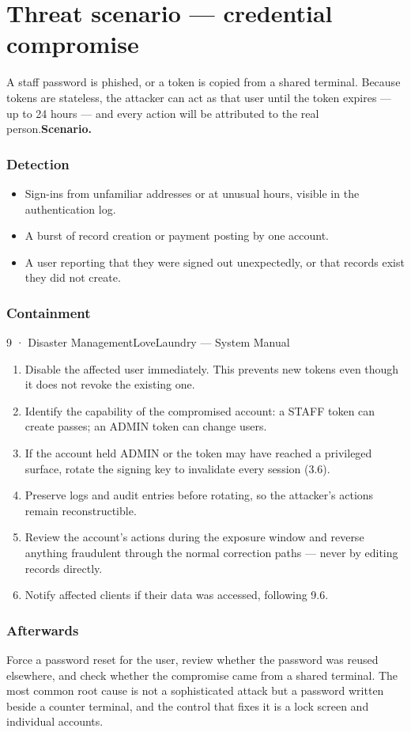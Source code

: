 \documentclass[11pt,a4paper,oneside]{book}
\begin{document}
\section*{Threat scenario — credential compromise}
A staff password is phished, or a token is copied from a shared terminal. Because tokens are stateless, the attacker can act as that user until the token expires — up to 24 hours — and every action will be attributed to the real person.\textbf{Scenario.}

\subsubsection*{Detection}
\begin{itemize}
\item Sign-ins from unfamiliar addresses or at unusual hours, visible in the authentication log.
\item A burst of record creation or payment posting by one account.
\item A user reporting that they were signed out unexpectedly, or that records exist they did not create.
\end{itemize}
\subsubsection*{Containment}
9 · Disaster ManagementLoveLaundry — System Manual

\begin{enumerate}
\item Disable the affected user immediately. This prevents new tokens even though it does not revoke the existing one.
\item Identify the capability of the compromised account: a STAFF token can create passes; an ADMIN token can change users.
\item If the account held ADMIN or the token may have reached a privileged surface, rotate the signing key to invalidate every session (3.6).
\item Preserve logs and audit entries before rotating, so the attacker's actions remain reconstructible.
\item Review the account's actions during the exposure window and reverse anything fraudulent through the normal correction paths — never by editing records directly.
\item Notify affected clients if their data was accessed, following 9.6.
\end{enumerate}
\subsubsection*{Afterwards}
Force a password reset for the user, review whether the password was reused elsewhere, and check whether the compromise came from a shared terminal. The most common root cause is not a sophisticated attack but a password written beside a counter terminal, and the control that fixes it is a lock screen and individual accounts.
\end{document}
